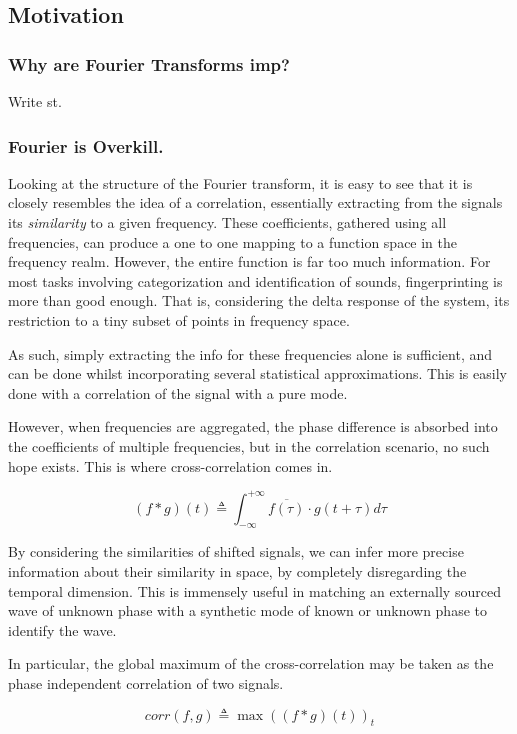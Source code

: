 \subsection{Motivation}

\subsubsection{Why are Fourier Transforms imp?} Write st.

\subsubsection{Fourier is Overkill.}
Looking at the structure of the Fourier transform, it is easy to see that it is
closely resembles the idea of a correlation, essentially extracting from the
signals its \emph{similarity} to a given frequency. These coefficients, gathered
using all frequencies, can produce a one to one mapping to a function space in
the frequency realm. However, the entire function is far too much information.
For most tasks involving categorization and identification of sounds,
fingerprinting is more than good enough. That is, considering the delta response
of the system, its restriction to a tiny subset of points in frequency space.

As such, simply extracting the info for these frequencies alone is sufficient,
and can be done whilst incorporating several statistical approximations. This is
easily done with a correlation of the signal with a pure mode. 

However, when frequencies are aggregated, the phase difference is absorbed into
the coefficients of multiple frequencies, but in the correlation scenario, no
such hope exists. This is where cross-correlation comes in. 

\begin{equation}
    (f \ast g)(t) \triangleq \int_{-\infty}^{+\infty} \overline{f(\tau)} \cdot g(t+\tau) d\tau
\end{equation}

By considering the similarities of shifted signals, we can infer more precise
information about their similarity in space, by completely disregarding the
temporal dimension. This is immensely useful in matching an externally sourced
wave of unknown phase with a synthetic mode of known or unknown phase to
identify the wave.

In particular, the global maximum of the cross-correlation may be taken as the
phase independent correlation of two signals.

\begin{equation}
    corr(f, g) \triangleq \max((f \ast g) (t))_t
\end{equation}
